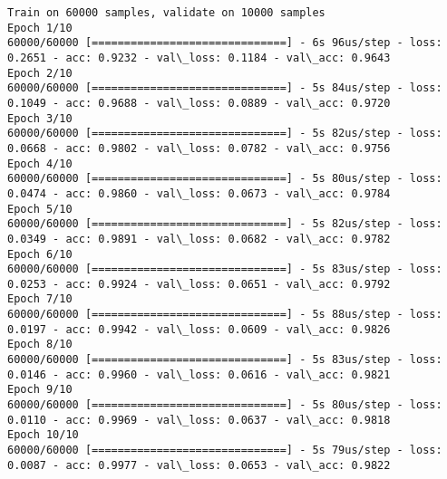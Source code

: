 \documentclass[11pt]{article}
\begin{document}
    \begin{Verbatim}[commandchars=\\\{\}]
Train on 60000 samples, validate on 10000 samples
Epoch 1/10
60000/60000 [==============================] - 6s 96us/step - loss: 0.2651 - acc: 0.9232 - val\_loss: 0.1184 - val\_acc: 0.9643
Epoch 2/10
60000/60000 [==============================] - 5s 84us/step - loss: 0.1049 - acc: 0.9688 - val\_loss: 0.0889 - val\_acc: 0.9720
Epoch 3/10
60000/60000 [==============================] - 5s 82us/step - loss: 0.0668 - acc: 0.9802 - val\_loss: 0.0782 - val\_acc: 0.9756
Epoch 4/10
60000/60000 [==============================] - 5s 80us/step - loss: 0.0474 - acc: 0.9860 - val\_loss: 0.0673 - val\_acc: 0.9784
Epoch 5/10
60000/60000 [==============================] - 5s 82us/step - loss: 0.0349 - acc: 0.9891 - val\_loss: 0.0682 - val\_acc: 0.9782
Epoch 6/10
60000/60000 [==============================] - 5s 83us/step - loss: 0.0253 - acc: 0.9924 - val\_loss: 0.0651 - val\_acc: 0.9792
Epoch 7/10
60000/60000 [==============================] - 5s 88us/step - loss: 0.0197 - acc: 0.9942 - val\_loss: 0.0609 - val\_acc: 0.9826
Epoch 8/10
60000/60000 [==============================] - 5s 83us/step - loss: 0.0146 - acc: 0.9960 - val\_loss: 0.0616 - val\_acc: 0.9821
Epoch 9/10
60000/60000 [==============================] - 5s 80us/step - loss: 0.0110 - acc: 0.9969 - val\_loss: 0.0637 - val\_acc: 0.9818
Epoch 10/10
60000/60000 [==============================] - 5s 79us/step - loss: 0.0087 - acc: 0.9977 - val\_loss: 0.0653 - val\_acc: 0.9822

    \end{Verbatim}

    \begin{center}
    \end{center}
    { \hspace*{\fill} \\}
    

    
    
    
    
\end{document}
